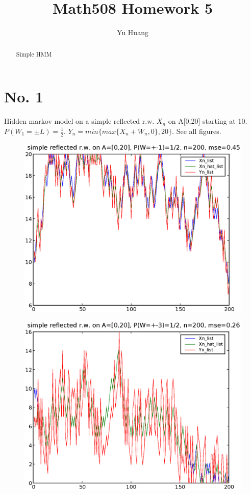 \documentclass[a4paper,10pt]{article}
\title{Math508 Homework 5}
\author{Yu Huang}
\begin{document}
\maketitle

\begin{abstract}
Simple HMM
\end{abstract}

\section{No. 1}
Hidden markov model on a simple reflected r.w. $X_n$ on A[0,20] starting at 10. $P(W_1 = \pm L) = \frac{1}{2}$. $Y_n = min\{max\{X_n+W_n, 0\}, 20\}$. See all figures.

\begin{figure}[h]
\includegraphics[width=1\textwidth]{hw5_1_K_20_L_1_n_200.eps}
\caption{}
\end{figure}

\begin{figure}[p]
\includegraphics[width=1\textwidth]{hw5_1_K_20_L_3_n_200.eps}
\caption{}
\end{figure}
\end{document}
